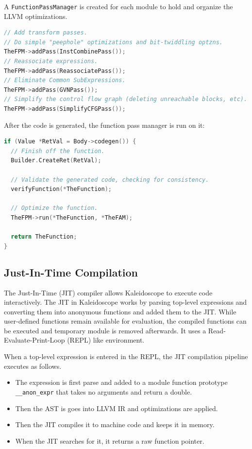 \documentclass[acmlarge, nonacm]{acmart}
\begin{document}
A \verb|FunctionPassManager| is created for each module to hold and organize the LLVM optimizations.

\begin{lstlisting}[language=C++]
// Add transform passes.
// Do simple "peephole" optimizations and bit-twiddling optzns.
TheFPM->addPass(InstCombinePass());
// Reassociate expressions.
TheFPM->addPass(ReassociatePass());
// Eliminate Common SubExpressions.
TheFPM->addPass(GVNPass());
// Simplify the control flow graph (deleting unreachable blocks, etc).
TheFPM->addPass(SimplifyCFGPass());
\end{lstlisting}

After the code is generated, the function pass manager is run on it:
\begin{lstlisting}[language=C++]
if (Value *RetVal = Body->codegen()) {
  // Finish off the function.
  Builder.CreateRet(RetVal);

  // Validate the generated code, checking for consistency.
  verifyFunction(*TheFunction);

  // Optimize the function.
  TheFPM->run(*TheFunction, *TheFAM);

  return TheFunction;
}
\end{lstlisting}


\subsection{Just-In-Time Compilation}
The Just-In-Time (JIT) compiler allows Kaleidoscope to execute code interactively. The JIT in Kaleidoscope works by parsing top-level expressions and converting them into anonymous functions and added them to the JIT. While user-defined functions remain available for evaluation, the compiled functions can be executed and temporary module is removed afterwards. It uses a Read-Evaluate-Print-Loop (REPL) like environment.

When a top-level expression is entered in the REPL, the JIT compilation pipeline executes as follows. 
\begin{itemize} 
\item The expression is first parse and added to a module function prototype \verb|__anon_expr| that takes no arguments and return a double.
\item Then the AST is goes into LLVM IR and optimizations are applied. 
\item Then the JIT compiles it to machine code and keeps it in memory.
\item When the JIT searches for it, it returns a raw function pointer.
\end{itemize}
\end{document}
